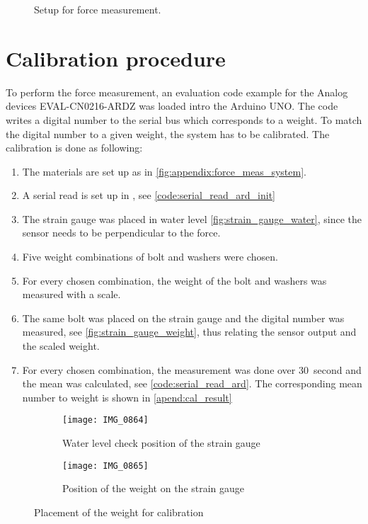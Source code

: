 \begin{figure}[H]
\centering
\def\svgwidth{\columnwidth}

%
\caption{Setup for force measurement.}
		\label{fig:appendix:force_meas_system}
\end{figure}

\section*{Calibration procedure}
To perform the force measurement, an evaluation code example for the Analog devices EVAL-CN0216-ARDZ was loaded intro the Arduino UNO. The code writes a digital number to the serial bus which corresponds to a weight. To match the digital number to a given weight, the system has to be calibrated. The calibration is done as following: 

\begin{enumerate}
\item The materials are set up as in \autoref{fig:appendix:force_meas_system}.
\item A serial read is set up in \matlab, see \autoref{code:serial_read_ard_init}
\item The strain gauge was placed in water level \autoref{fig:strain_gauge_water}, since the sensor needs to be perpendicular to the force.
\item  Five weight combinations of bolt and washers were chosen.
\item  For every chosen combination, the weight of the bolt and washers was measured with a scale.
\item The same bolt was placed on the strain gauge and the digital number was measured, see \autoref{fig:strain_gauge_weight}, thus relating the sensor output and the scaled weight. 
\item For every chosen combination, the measurement was done over \SI{30}{second} and the mean was calculated, see \autoref{code:serial_read_ard}. The corresponding mean number to weight is shown in \autoref{apend:cal_result}
\end{enumerate}

\begin{figure}[H]
\centering
\begin{subfigure}[htbp]{0.45\textwidth}
		\texttt{[image: IMG\_0864]}
		\caption{Water level check position of the strain gauge}
		\label{fig:strain_gauge_water}
\end{subfigure}\vspace{10pt}
\begin{subfigure}[htbp]{0.45\textwidth}
		\texttt{[image: IMG\_0865]}
		\caption{Position of the weight on the strain gauge}
		\label{fig:strain_gauge_weight}
\end{subfigure} \hspace{10pt}
\caption{Placement of the weight for calibration}
\label{fig:bc_holder}
\end{figure}


